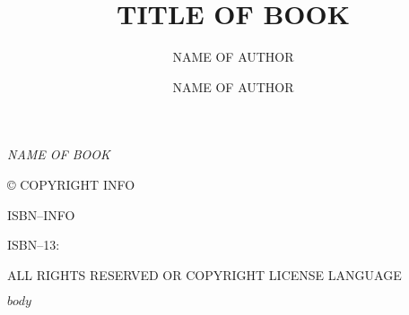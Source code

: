 \documentclass[10pt,twoside,openright]{memoir}
\author{NAME OF AUTHOR}
\author{NAME OF AUTHOR}
\title{TITLE OF BOOK}
\date{}
\makeatletter
\def\maketitle{%
  \null
  \thispagestyle{empty}%
  \vfill
  \begin{center}\leavevmode
    \normalfont
    {\LARGE\raggedleft \@author\par}%
    \hrulefill\par
    {\huge\raggedright \@title\par}%
    \vskip 1cm
  \end{center}%
  \vfill
  \null
  \cleardoublepage
  }
\makeatother
\begin{document}
\let\cleardoublepage\clearpage


\maketitle

\frontmatter

\null\vfill

\begin{flushleft}
\textit{NAME OF BOOK}


© COPYRIGHT INFO


ISBN--INFO

ISBN--13: 
\bigskip





ALL RIGHTS RESERVED OR COPYRIGHT LICENSE LANGUAGE




\end{flushleft}
\let\cleardoublepage\clearpage

\mainmatter
\sloppy

$body$
\end{document}
